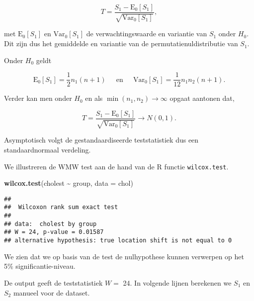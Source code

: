 \documentclass[
  12pt,dutch,coursenotes]{book}
\newenvironment{Shaded}{\begin{snugshade}}{\end{snugshade}}
\newcommand{\DataTypeTok}[1]{\textcolor[rgb]{0.13,0.29,0.53}{#1}}
\newcommand{\KeywordTok}[1]{\textcolor[rgb]{0.13,0.29,0.53}{\textbf{#1}}}
\newcommand{\NormalTok}[1]{#1}
\newcommand{\OperatorTok}[1]{\textcolor[rgb]{0.81,0.36,0.00}{\textbf{#1}}}
\newcommand{\StringTok}[1]{\textcolor[rgb]{0.31,0.60,0.02}{#1}}
\theoremstyle{definition}
\theoremstyle{definition}
\theoremstyle{definition}
\theoremstyle{remark}
\begin{document}
\[
  T = \frac{S_1-\text{E}_{0}\left[S_1\right]}{\sqrt{\text{Var}_{0}\left[S_1\right]}},
\]

met \(\text{E}_{0}\left[S_1\right]\) en \(\text{Var}_{0}\left[S_1\right]\) de verwachtingswaarde en variantie van \(S_1\) onder \(H_0\). Dit zijn dus het gemiddelde en variantie van de permutatienuldistributie van \(S_1\).

Onder \(H_0\) geldt

\[
   \text{E}_{0}\left[S_1\right]= \frac{1}{2}n_1(n+1) \;\;\;\;\text{ en }\;\;\;\; \text{Var}_{0}\left[S_1\right]=\frac{1}{12}n_1n_2(n+1).
 \]

Verder kan men onder \(H_0\) en als \(\min(n_1,n_2)\rightarrow \infty\) opgaat aantonen dat,

\[
    T = \frac{S_1-\text{E}_{0}\left[S_1\right]}{\sqrt{\text{Var}_{0}\left[S_1\right]}} \rightarrow N(0,1).  
 \]

Asymptotisch volgt de gestandaardiseerde teststatistiek dus een standaardnormaal verdeling.

We illustreren de WMW test aan de hand van de R functie \texttt{wilcox.test}.

\begin{Shaded}
\begin{Highlighting}[]
\KeywordTok{wilcox.test}\NormalTok{(cholest }\OperatorTok{\textasciitilde{}}\StringTok{ }\NormalTok{group, }\DataTypeTok{data =}\NormalTok{ chol)}
\end{Highlighting}
\end{Shaded}

\begin{verbatim}
## 
##  Wilcoxon rank sum exact test
## 
## data:  cholest by group
## W = 24, p-value = 0.01587
## alternative hypothesis: true location shift is not equal to 0
\end{verbatim}

We zien dat we op basis van de test de nulhypothese kunnen verwerpen op het 5\% significantie-niveau.

De output geeft de teststatistiek \(W=\) 24.
In volgende lijnen berekenen we \(S_1\) en \(S_2\) manueel voor de dataset.
\end{document}
